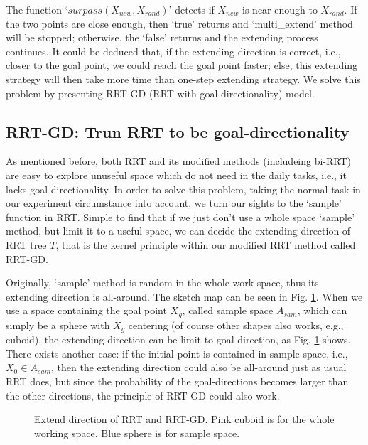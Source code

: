 \documentclass[letterpaper, 10 pt, conference]{ieeeconf}  %
\begin{document}
The function `$surpass(X_{new},X_{rand})$' detects if $X_{new}$ is near enough to $X_{rand}$. If the two points are close enough, then `true' returns and `multi\_extend' method will be stopped; otherwise, the `false' returns and the extending process continues. It could be deduced that, if the extending direction is correct, i.e., closer to the goal point, we could reach the goal point faster; else, this extending strategy will then take more time than one-step extending strategy. We solve this problem by presenting RRT-GD (RRT with goal-directionality) model. 

\subsection{RRT-GD: Trun RRT to be goal-directionality}

As mentioned before, both RRT and its modified methods (includeing bi-RRT) are easy to explore unuseful space which do not need in the daily tasks, i.e., it lacks goal-directionality. In order to solve this problem, taking the normal task in our experiment circumstance into account, we turn our sights to the `sample' function in RRT. Simple to find that if we just don't use a whole space `sample' method, but limit it to a useful space, we can decide the extending direction of RRT tree $T$, that is the kernel principle within our modified RRT method called RRT-GD.

Originally, `sample' method is random in the whole work space, thus its extending direction is all-around. The sketch map can be seen in Fig. \ref{fig_sketch}. When we use a space containing the goal point $X_{g}$, called sample space $A_{sam}$, which can simply be a sphere with $X_{g}$ centering (of course other shapes also works, e.g., cuboid), the extending direction can be limit to goal-direction, as Fig. \ref{fig_sketch} shows. There exists another case: if the initial point is contained in sample space, i.e., $X_{0}\in A_{sam}$, then the extending direction could also be all-around just as usual RRT does, but since the probability of the goal-directions becomes larger than the other directions, the principle of RRT-GD could also work.

\begin{figure}[thpb]
      \centering
      \caption{Extend direction of RRT and RRT-GD. Pink cuboid is for the whole working space. Blue sphere is for sample space. }
      \label{fig_sketch}
\end{figure}
\end{document}

